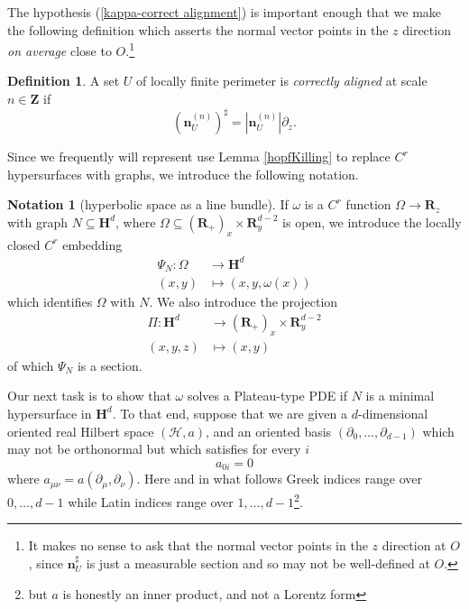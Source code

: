 \documentclass[reqno,12pt,letterpaper]{amsart}
\newcommand{\ZZ}{\mathbf{Z}}
\newcommand{\RR}{\mathbf{R}}
\newcommand{\Hyp}{\mathbf H}
\newcommand{\Hilb}{\mathcal H}
\newcommand{\normal}{\mathbf n}
\newcommand{\dfn}[1]{\emph{#1}\index{#1}}
\theoremstyle{definition}
\newtheorem{definition}[theorem]{Definition}
\newtheorem{notation}[theorem]{Notation}
\numberwithin{equation}{section}
\begin{document}
The hypothesis (\ref{kappa-correct alignment}) is important enough that we make the following definition which asserts the normal vector points in the $z$ direction \emph{on average} close to $O$.\footnote{It makes no sense to ask that the normal vector points in the $z$ direction at $O$, since $\normal^\sharp_U$ is just a measurable section and so may not be well-defined at $O$.}

\begin{definition}
A set $U$ of locally finite perimeter is \dfn{correctly aligned} at scale $n \in \ZZ$ if
$$(\normal^{(n)}_U)^\sharp = |\normal^{(n)}_U|\partial_z.$$
\end{definition}

Since we frequently will represent use Lemma \ref{hopfKilling} to replace $C^r$ hypersurfaces with graphs, we introduce the following notation.

\begin{notation}[hyperbolic space as a line bundle]\label{hyperbolic line bundle}
    If $\omega$ is a $C^r$ function $\Omega \to \RR_z$ with graph $N \subseteq \Hyp^d$, where $\Omega \subseteq (\RR_+)_x \times \RR^{d - 2}_y$ is open, we introduce the locally closed $C^r$ embedding
    \begin{align*}
        \Psi_N: \Omega &\to \Hyp^d \\
        (x, y) &\mapsto (x, y, \omega(x))
    \end{align*}
    which identifies $\Omega$ with $N$.
    We also introduce the projection
    \begin{align*}
        \Pi: \Hyp^d &\to (\RR_+)_x \times \RR^{d - 2}_y\\
        (x, y, z) &\mapsto (x, y)
    \end{align*}
    of which $\Psi_N$ is a section.
\end{notation}

Our next task is to show that $\omega$ solves a Plateau-type PDE if $N$ is a minimal hypersurface in $\Hyp^d$.
To that end, suppose that we are given a $d$-dimensional oriented real Hilbert space $(\Hilb, a)$, and an oriented basis $(\partial_0, \dots, \partial_{d - 1})$ which may not be orthonormal but which satisfies for every $i$
\begin{equation}\label{0th coordinate orthogonal}
a_{0i} = 0
\end{equation}
where $a_{\mu\nu} = a(\partial_\mu, \partial_\nu)$.
Here and in what follows Greek indices range over $0, \dots, d - 1$ while Latin indices range over $1, \dots, d - 1$\footnote{but $a$ is honestly an inner product, and not a Lorentz form}.
\end{document}
